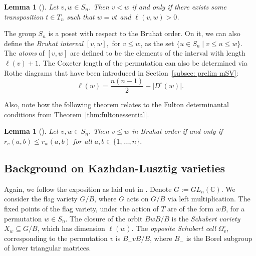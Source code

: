 \documentclass[11pt]{amsart}
\newtheorem{lemma}[theorem]{Lemma}
\theoremstyle{definition}
\theoremstyle{definition}
\theoremstyle{definition}
\theoremstyle{definition}
\newcommand{\Dc}{D^{\circ}}
\begin{document}
\begin{lemma}[{\cite[Lemma 2.2.1]{bjorner2005combinatorics}}]
    Let $v,w \in S_n$. Then $v < w$ if and only if there exists some transposition $t \in T_n$ such that $w = vt$ and $\ell(v,w) >0$.
\end{lemma}

\noindent The group $S_n$ is a poset with respect to the Bruhat order. On it, we can also define the \emph{Bruhat interval} $[v,w],$ for $v\leq w$, as the set $\{ u \in S_n \mid v \leq u \leq w \}$. The \emph{atoms} of $[v,w]$ are defined to be the elements of the interval with length $\ell(v)+1$. The Coxeter length of the permutation can also be determined via Rothe diagrams that have been introduced in Section~\ref{subsec: prelim mSV}:
$$\ell(w) = \frac{n(n-1)}{2} - |\Dc(w)|.$$

\noindent Also, note how the following theorem relates to the Fulton determinantal conditions from Theorem~\ref{thm:fultonessential}.
\begin{lemma}[{\cite[Theorem 2.1.5]{bjorner2005combinatorics}}]
    Let $v,w \in S_n$. Then $v \leq w$ in Bruhat order if and only if $r_v(a,b) \leq r_w(a,b)$
    for all $a,b \in \{1, \ldots, n \}$.
\end{lemma}


\subsection{Background on Kazhdan-Lusztig varieties} 
\noindent Again, we follow the exposition as laid out in \cite{donten2021complexity}. Denote $G := GL_n(\mathbb C)$. We consider the flag variety $G/B$, where $G$ acts on $G/B$ via left multiplication. The fixed points of the flag variety, under the action of $T$ are of the form $wB$, for a permutation $w \in S_n$. The closure of the orbit $BwB/B$ is the \textit{Schubert variety} $X_w \subseteq G/B$, which has dimension $\ell(w)$. The \textit{opposite Schubert cell} $\Omega_v^\circ$, corresponding to the permutation $v$ is $B_{-}vB/B$, where $B_-$ is the Borel subgroup of lower triangular matrices. 
\end{document}
